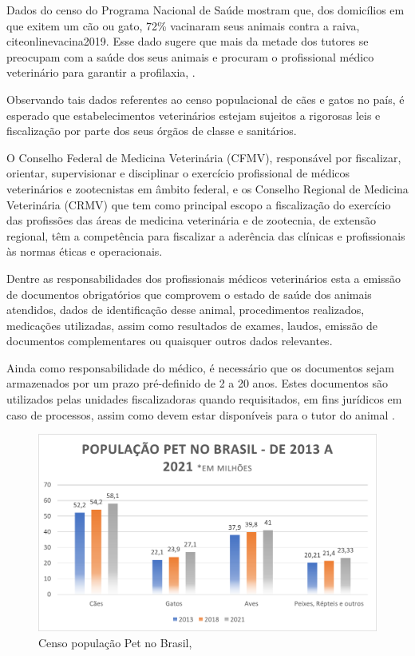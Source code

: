 \documentclass[
    12pt,               %
    openright,          %
    oneside,
    a4paper,            %
    BIBLATEX,           %
    TODO,               %
    english,            %
    brazil              %
    ]{ifsp-spo-inf-ctds}
\begin{document}
    Dados do censo do Programa Nacional de Saúde mostram que, dos domicílios em que exitem um cão ou gato, 72\% vacinaram seus animais contra a raiva, citeonline{vacina2019}. Esse dado sugere que mais da metade dos tutores se preocupam com a saúde dos seus animais e procuram o profissional médico veterinário para garantir a profilaxia, .
     
    Observando tais dados referentes ao censo populacional de cães e gatos no país, é esperado que estabelecimentos veterinários estejam sujeitos a rigorosas leis e fiscalização por parte dos seus órgãos de classe e sanitários.
    
    O Conselho Federal de Medicina Veterinária (CFMV), responsável por fiscalizar, orientar, supervisionar e disciplinar o exercício profissional de médicos veterinários e zootecnistas em âmbito federal, e os Conselho Regional de Medicina Veterinária (CRMV) que tem como principal escopo a fiscalização do exercício das profissões das áreas de medicina veterinária e de zootecnia, de extensão regional,  têm a competência para fiscalizar a aderência das clínicas e profissionais às normas éticas e operacionais.
     
    Dentre as responsabilidades dos profissionais médicos veterinários esta a emissão de documentos obrigatórios que comprovem o estado de saúde dos animais atendidos, dados de identificação desse animal, procedimentos realizados, medicações utilizadas, assim como resultados de exames, laudos, emissão de documentos complementares ou quaisquer outros dados relevantes.
    
    Ainda como responsabilidade do médico, é necessário que os documentos sejam armazenados por um prazo pré-definido de 2 a 20 anos. Estes documentos são utilizados pelas unidades fiscalizadoras quando requisitados, em fins jurídicos em caso de processos, assim como devem estar disponíveis para o tutor do animal .
     
     \begin{figure}[H]
        \centering
        \includegraphics{images/grafico_censopet.png}
        \caption{Censo população Pet no Brasil, }
        \label{fig:grafico_pet}
    \end{figure}
\end{document}
